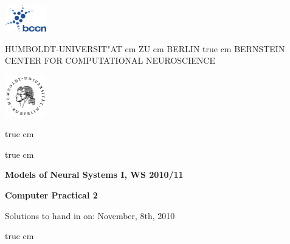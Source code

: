 \documentclass[12pt, a4]{article}
\begin{document}
\parbox{2cm}{
\includegraphics[width=1.8cm]{bccnlogo}
}
\parbox{11cm}{
\begin{center}
\large HUMBOLDT-UNIVERSIT"AT  cm ZU  cm BERLIN
 true cm
\mgross BERNSTEIN CENTER FOR COMPUTATIONAL NEUROSCIENCE
\end{center}
}
\parbox{2cm}
{
\hfill
\includegraphics[width=1.8cm]{hublogo}
}

 true cm





 true cm
\centerline{\bf Models of Neural Systems I, WS 2010/11}
\centerline{\bf Computer Practical 2}
\centerline{Solutions to hand in on: November, 8th, 2010}


 true cm
\end{document}
